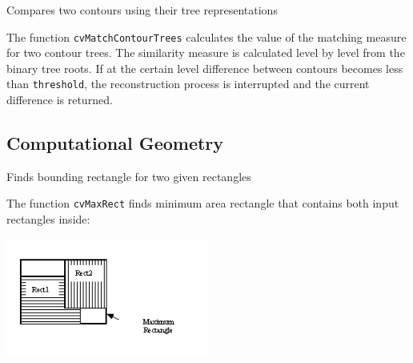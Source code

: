 \label{MatchContourTrees}

Compares two contours using their tree representations


\begin{description}
\end{description}

The function \texttt{cvMatchContourTrees} calculates the value of the matching measure for two contour trees. The similarity measure is calculated level by level from the binary tree roots. If at the certain level difference between contours becomes less than \texttt{threshold}, the reconstruction process is interrupted and the current difference is returned.

\subsection{Computational Geometry}

\label{MaxRect}

Finds bounding rectangle for two given rectangles


\begin{description}
\end{description}

The function \texttt{cvMaxRect} finds minimum area rectangle that contains both input rectangles inside:

\includegraphics[width=0.5\textwidth]{pics/maxrect.png}

